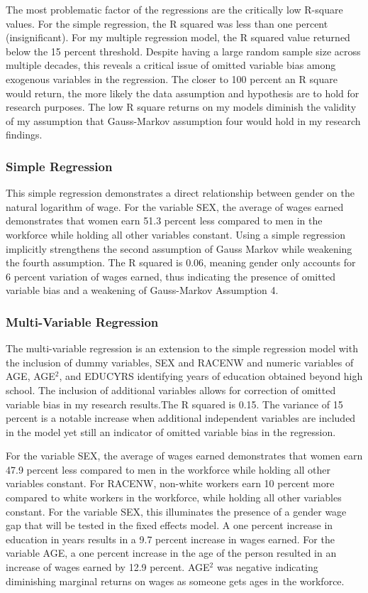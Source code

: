 \documentclass[12pt, English]{article}
\begin{document}
The most problematic factor of the regressions are the critically low R-square values. For the simple regression, the R squared was less than one percent (insignificant). For my multiple regression model, the R squared value returned below the 15 percent threshold. Despite having a large random sample size across multiple decades, this reveals a critical issue of omitted variable bias among exogenous variables in the regression. The closer to 100 percent an R square would return, the more likely the data assumption and hypothesis are to hold for research purposes. The low R square returns on my models diminish the validity of my assumption that Gauss-Markov assumption four would hold in my research findings. 

\subsubsection*{Simple Regression}
This simple regression demonstrates a direct relationship between gender on the natural logarithm of wage. For the variable SEX, the average of wages earned demonstrates that women earn 51.3 percent less compared to men in the workforce while holding all other variables constant. Using a simple regression implicitly strengthens the second assumption of Gauss Markov while weakening the fourth assumption. The R squared is 0.06, meaning gender only accounts for 6 percent variation of wages earned, thus indicating the presence of omitted variable bias and a weakening of Gauss-Markov Assumption 4. 


\subsubsection*{Multi-Variable Regression}
The multi-variable regression is an extension to the simple regression model with the inclusion of dummy variables, SEX and RACENW and numeric variables of AGE, AGE$^2$, and EDUCYRS identifying years of education obtained beyond high school. The inclusion of additional variables allows for correction of omitted variable bias in my research results.The R squared is 0.15. The variance of 15 percent is a notable increase when  additional independent variables are included in the model yet still an indicator of omitted variable bias in the regression.

For the variable SEX, the average of wages earned demonstrates that women earn 47.9 percent less compared to men in the workforce while holding all other variables constant. For RACENW, non-white workers earn 10 percent more compared to white workers in the workforce, while holding all other variables constant. For the variable SEX, this illuminates the presence of a gender wage gap that will be tested in the fixed effects model. A one percent increase in education in years results in a 9.7 percent increase in wages earned. For the variable AGE, a one percent increase in the age of the person resulted in an increase of wages earned by 12.9 percent. AGE$^2$ was negative indicating diminishing marginal returns on wages as someone gets ages in the workforce. 
\end{document}
